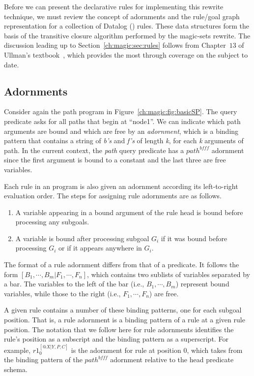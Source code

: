 Before we can present the declarative rules for implementing this rewrite
technique, we must review the concept of adornments and the rule/goal graph
representation for a collection of Datalog (\OVERLOG) rules.  These data
structures form the basis of the transitive closure algorithm performed by the
magic-sets rewrite.  The discussion leading up to
Section~\ref{ch:magic:sec:rules} follows from Chapter~$13$ of Ullman's
textbook~, which provides the most through coverage on the
subject to date.


\subsection{Adornments}

Consider again the path program in Figure~\ref{ch:magic:fig:basicSP}.  The
query predicate  asks for all paths that begin at
``node1''.  We can indicate which path arguments are bound and which are free
by an {\em adornment}, which is a binding pattern that contains a string of
{\em b's} and {\em f's} of length {\em k}, for each {\em k} arguments
of path.  In the current context, the {\em path} query predicate has a
$path^{bfff}$ adornment since the first argument is bound to a constant and the
last three are free variables.

Each rule in an \OVERLOG program is also given an adornment according its
left-to-right evaluation order.  The steps for assigning rule adornments are as
follows.
\begin{enumerate}
    \ssp
    \item A variable appearing in a bound argument of the rule head is bound before processing any subgoals.
    \item A variable is bound after processing subgoal $G_i$ if it was bound 
          before processing $G_i$ or if it appears anywhere in $G_i$.
\end{enumerate}
The format of a rule adornment differs from that of a predicate.  It follows the form
$[B_1,\cdots,B_m|F_1,\cdots,F_n]$, which contains two sublists of variables
separated by a bar.  The variables to the left of the bar (i.e.,
$B_1,\cdots,B_m$) represent bound variables, while those to the right (i.e.,
$F_1,\cdots,F_n$) are free. 

A given rule contains a number of these binding patterns, one for each subgoal
position.  That is, a rule adornment is a binding pattern of a rule at a given
rule position.  The notation that we follow here for rule adornments identifies
the rule's position as a subscript and the binding pattern as a superscript.
For example, $r1_0^{[@X|Y,P,C]}$ is the adornment for rule  at position
$0$, which takes from the binding pattern of the $path^{bfff}$ adornment
relative to the head predicate schema.

